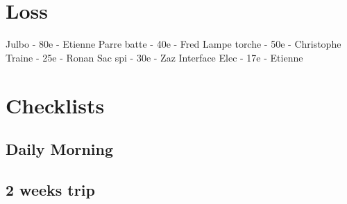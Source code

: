 \documentclass[8pt]{article} %
\begin{document}
\section{Loss}
Julbo - 80e - Etienne
Parre batte - 40e - Fred
Lampe torche - 50e - Christophe
Traine - 25e - Ronan
Sac spi - 30e - Zaz
Interface Elec - 17e - Etienne

\section{Checklists}
\subsection{Daily Morning}
	
\subsection{2 weeks trip}			
\end{document}
